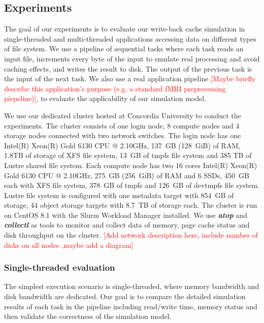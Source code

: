 \documentclass[conference]{IEEEtran}
\begin{document}
		\subsection{Experiments}
		
        	The goal of our experiments is to evaluate our write-back cache 
			simulation in single-threaded and multi-threaded applications
			accessing data on different types of file system. We use a pipeline
			of sequential tasks where each task reads an input file, increments
			every byte of the input to emulate real processing and avoid caching
			effects, and writes the result to disk. The output of the previous
			task is the input of the next task. We also use a real application 
            pipeline \textcolor{red}{[Maybe briefly describe this application's purpose (e.g. a standard fMRI preprocessing piepeline)]}, to evaluate the applicability of our simulation model. 
			
			We use our dedicated cluster hosted at Concordia University to conduct 
			the experiments. The cluster consists of one login node, 8 compute nodes 
			and 4 storage nodes connected with two network switches. The login node 
			has one Intel(R) Xeon(R) Gold 6130 CPU @ 2.10GHz, 137~GB (128~GiB) of RAM, 
			1.8TB of storage of XFS file system, 13~GB of tmpfs file system and 385 TB of 
			Lustre shared file system. Each compute node has two 16 cores Intel(R) 
			Xeon(R) Gold 6130 CPU @ 2.10GHz, 275~GB (256~GiB) of RAM and 6 SSDs, 
			450~GB each with XFS file system, 378~GB of tmpfs and 126~GB of devtmpfs file system.
			Lustre file system is configured with one metadata target with 854~GB 
			of storage, 44 object storage targets with 8.7~TB of storage each. 
			The cluster is run on CentOS 8.1 with the Slurm Workload Manager installed. 
			We use \textbf{\textit{atop}} and \textbf{\textit{collectl}} as tools to 
			monitor and collect data of memory, page cache status and disk throughput 
			on the cluster. 
			\textcolor{red}{[Add network description here, include number of disks 
			on all nodes ,maybe add a diagram]}
			
			\subsubsection{Single-threaded evaluation}
			
			The simplest execution scenario is single-threaded, where memory 
			bandwidth and disk bandwidth are dedicated. Our goal is to 
			compare the detailed simulation results of each task in the pipeline 
			including read/write time, memory status and then validate the correctness 
			of the simulation model. 
\end{document}
